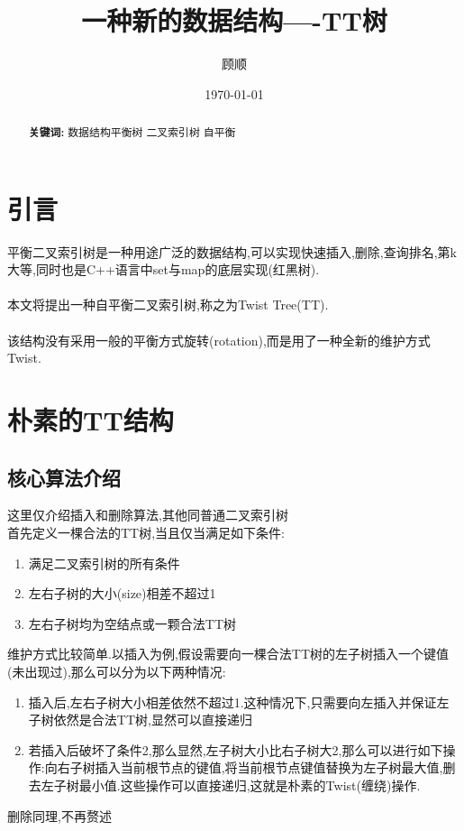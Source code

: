 \documentclass[UTF8]{ctexart}	%
\title{\heiti 一种新的数据结构----TT树} %
\author{\kaishu 顾顺}  %
\date{\today}
\begin{document}
	\maketitle    %
	\tableofcontents  %
	\begin{abstract}
		\textbf{关键词: }数据结构\space 平衡树 \space 二叉索引树 \space 自平衡
	\end{abstract}
	
	\newpage

	\section{引言}
	\space\space 平衡二叉索引树是一种用途广泛的数据结构,可以实现快速插入,删除,查询排名,第k大等,同时也是C++语言中set与map的底层实现(红黑树).
	\\\\
	\space\space 本文将提出一种自平衡二叉索引树,称之为Twist Tree(TT).
	\\\\
	\space\space 该结构没有采用一般的平衡方式旋转(rotation),而是用了一种全新的维护方式Twist.
	
	\newpage

	\section{朴素的TT结构}
	\subsection{核心算法介绍}
		这里仅介绍插入和删除算法,其他同普通二叉索引树
		\\
		\indent 首先定义一棵合法的TT树,当且仅当满足如下条件:
			\begin{enumerate}

			\item 满足二叉索引树的所有条件

			\item 左右子树的大小(size)相差不超过1

			\item 左右子树均为空结点或一颗合法TT树

			\end{enumerate}

		维护方式比较简单.以插入为例,假设需要向一棵合法TT树的左子树插入一个键值(未出现过),那么可以分为以下两种情况:
			\begin{enumerate}

			\item 插入后,左右子树大小相差依然不超过1.这种情况下,只需要向左插入并保证左子树依然是合法TT树,显然可以直接递归

			\item 若插入后破坏了条件2,那么显然,左子树大小比右子树大2,那么可以进行如下操作:向右子树插入当前根节点的键值,将当前根节点键值替换为左子树最大值,删去左子树最小值.这些操作可以直接递归,这就是朴素的Twist(缠绕)操作.

			\end{enumerate}
		删除同理,不再赘述
\end{document}
